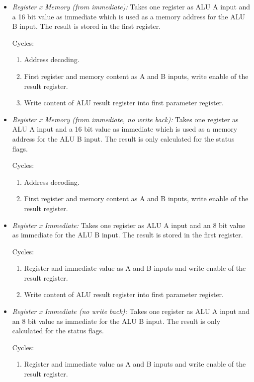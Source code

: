 \begin{itemize}
  \item \emph{Register x Memory (from immediate):} Takes one register as \gls{ALU} A input and a 16 bit value as immediate which is used as a memory address for the \gls{ALU} B input.
  The result is stored in the first register.

  Cycles:
  \begin{enumerate}
    \item Address decoding.
    \item First register and memory content as A and B inputs, write enable of the result register.
    \item Write content of \gls{ALU} result register into first parameter register.
  \end{enumerate}

  \item \emph{Register x Memory (from immediate, no write back):} Takes one register as \gls{ALU} A input and a 16 bit value as immediate which is used as a memory address for the \gls{ALU} B input.
  The result is only calculated for the status flags.

  Cycles:
  \begin{enumerate}
    \item Address decoding.
    \item First register and memory content as A and B inputs, write enable of the result register.
  \end{enumerate}

  \item \emph{Register x Immediate:} Takes one register as \gls{ALU} A input and an 8 bit value as immediate  for the \gls{ALU} B input.
  The result is stored in the first register.

  Cycles:
  \begin{enumerate}
    \item Register and immediate value as A and B inputs and write enable of the result register.
    \item Write content of \gls{ALU} result register into first parameter register.
  \end{enumerate}

  \item \emph{Register x Immediate (no write back):} Takes one register as \gls{ALU} A input and an 8 bit value as immediate  for the \gls{ALU} B input.
  The result is only calculated for the status flags.

  Cycles:
  \begin{enumerate}
    \item Register and immediate value as A and B inputs and write enable of the result register.
  \end{enumerate}
\end{itemize}

